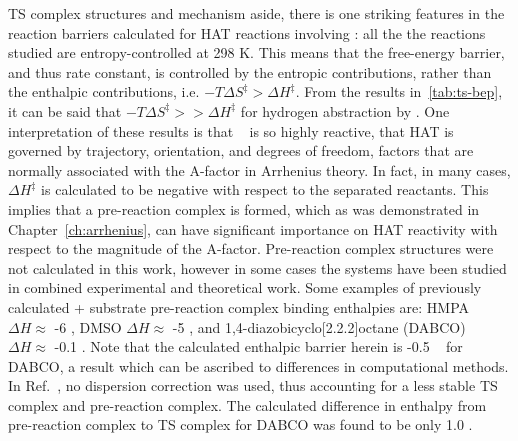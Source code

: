 
TS complex structures and mechanism aside, there is one striking features in the reaction barriers calculated for HAT reactions involving \cumo: all the the reactions studied are entropy-controlled at 298 K. This means that the free-energy barrier, and thus rate constant, is controlled by the entropic contributions, rather than the enthalpic contributions, i.e. $-T\Delta S^\ddagger > \Delta H^\ddagger$. From the results in~\ref{tab:ts-bep}, it can be said that $-T\Delta S^\ddagger >> \Delta H^\ddagger$ for hydrogen abstraction by \cumo. One interpretation of these results is that \cumo~ is so highly reactive, that HAT is governed by trajectory, orientation, and degrees of freedom, factors that are normally associated with the A-factor in Arrhenius theory. In fact, in many cases, $\Delta H^\ddagger$ is calculated to be negative with respect to the separated reactants. This implies that a pre-reaction complex is formed, which as was demonstrated in Chapter~\ref{ch:arrhenius}, can have significant importance on HAT reactivity with respect to the magnitude of the A-factor. Pre-reaction complex structures were not calculated in this work, however  in some cases the systems have been studied in combined experimental and theoretical work. Some examples of previously calculated \cumo + substrate pre-reaction complex binding enthalpies are: HMPA\footnotemark\ $\Delta H \approx$ -6 \kcalmol, DMSO $\Delta H \approx$ -5 \kcalmol, and 1,4-diazobicyclo[2.2.2]octane (DABCO)\cite{Salamone2011b} $\Delta H \approx$ -0.1 \kcalmol. Note that the calculated enthalpic barrier herein is -0.5 \kcalmol~ for DABCO, a result which can be ascribed to differences in computational methods. In Ref.~, no dispersion correction was used, thus accounting for a less stable TS complex and pre-reaction complex. The calculated difference in enthalpy from pre-reaction complex to TS complex for DABCO was found to be only 1.0 \kcalmol.


